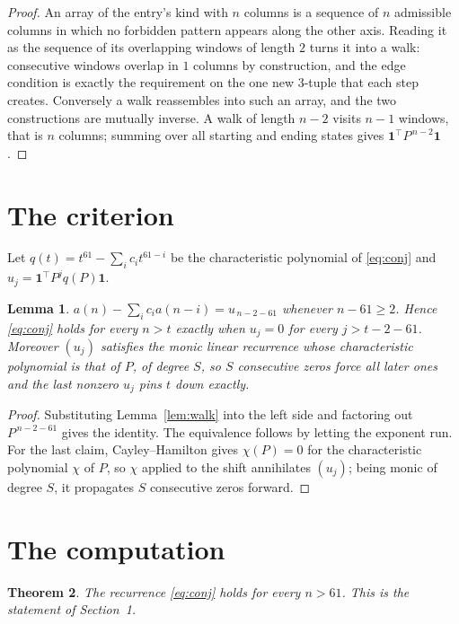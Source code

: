 \documentclass[11pt,a4paper]{article}
\theoremstyle{plain}
\newtheorem{theorem}{Theorem}
\newtheorem{lemma}[theorem]{Lemma}
\theoremstyle{definition}
\begin{document}
\begin{proof}
An array of the entry's kind with $n$ columns is a sequence of $n$ admissible columns in
which no forbidden pattern appears along the other axis. Reading it as the sequence of its
overlapping windows of length $2$ turns it into a walk: consecutive windows overlap in
$1$ columns by construction, and the edge condition is exactly the requirement on the one
new $3$-tuple that each step creates. Conversely a walk reassembles into such an array,
and the two constructions are mutually inverse. A walk of length $n-2$ visits $n-1$
windows, that is $n$ columns; summing over all starting and ending states gives
$\mathbf{1}^{\!\top}P^{\,n-2}\mathbf{1}$.
\end{proof}

\section{The criterion}

Let $q(t)=t^{61}-\sum_i c_i t^{61-i}$ be the characteristic polynomial of
\eqref{eq:conj} and $u_j=\mathbf{1}^{\!\top}P^{j}q(P)\mathbf{1}$.

\begin{lemma}\label{lem:crit}
$a(n)-\sum_i c_i a(n-i)=u_{\,n-2-61}$ whenever $n-61\ge2$. Hence
\eqref{eq:conj} holds for every $n>t$ exactly when $u_j=0$ for every
$j>t-2-61$. Moreover $(u_j)$ satisfies the monic linear recurrence whose
characteristic polynomial is that of $P$, of degree $S$, so $S$ consecutive zeros force all
later ones and the last nonzero $u_j$ pins $t$ down exactly.
\end{lemma}

\begin{proof}
Substituting Lemma~\ref{lem:walk} into the left side and factoring out
$P^{\,n-2-61}$ gives the identity. The equivalence follows by letting the exponent
run. For the last claim, Cayley--Hamilton gives $\chi(P)=0$ for the characteristic
polynomial $\chi$ of $P$, so $\chi$ applied to the shift annihilates $(u_j)$; being monic of
degree $S$, it propagates $S$ consecutive zeros forward.
\end{proof}

\section{The computation}

\begin{theorem}
The recurrence \eqref{eq:conj} holds for every $n>61$. This is the statement of
Section~1.
\end{theorem}
\end{document}
